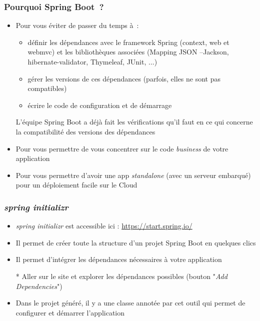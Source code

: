 \documentclass{beamer}
\begin{document}
\begin{frame}
  \frametitle{Pourquoi Spring Boot~?}
  \begin{itemize}
  \item Pour vous éviter de passer du temps à~:
  \begin{itemize}
  	\item définir les dépendances avec le framework Spring (context, web et webmvc) et les bibliothèques associées (Mapping JSON --Jackson, hibernate-validator, Thymeleaf, JUnit, ...)
  	\item gérer les versions de ces dépendances (parfois, elles ne sont pas compatibles)
  	\item écrire le code de configuration et de démarrage
  \end{itemize}
	\item[] L'équipe Spring Boot a déjà fait les vérifications qu'il faut en ce qui concerne la compatibilité des versions des dépendances
	\item Pour vous permettre de vous concentrer sur le code \textit{business} de votre application 
	\item Pour vous permettre d'avoir une app \textit{standalone} (avec un serveur embarqué) pour un déploiement facile sur le Cloud
\end{itemize}
\end{frame}

\begin{frame}
	\frametitle{\textit{spring initializr}}
	\begin{itemize}
		\item \textit{spring initializr} est accessible ici : \url{https://start.spring.io/}
		\item Il permet de créer toute la structure d'un projet Spring Boot en quelques clics
		\item Il permet d'intégrer les dépendances nécessaires à votre application
		\item[*] Aller sur le site et explorer les dépendances possibles (bouton "\textit{Add Dependencies}")
		\item Dans le projet généré, il y a une classe annotée par cet outil qui permet de configurer et démarrer l'application 
\end{itemize}
\end{frame}
\end{document}
